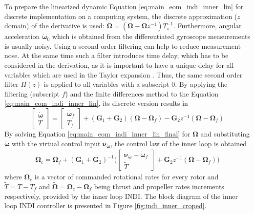 \documentclass[11pt, a4paper, twoside]{report}
\begin{document}
To prepare the linearized dynamic Equation \ref{eq:main_eom_indi_inner_lin} for discrete implementation on a computing system, the discrete approximation ($z$ domain) of the derivative is used: $\bm{\dot{\Omega}} = (\bm{\Omega} - \bm{\Omega}z^{-1})T_s^{-1}$. Furthermore, angular acceleration $\bm{\dot{\omega}}_0$ which is obtained from the differentiated gyroscope measurements is usually noisy. Using a second order filtering can help to reduce measurement nose. At the same time such a filter introduces time delay, which has to be considered in the derivation, as it is important to have a unique delay for all variables which are used in the Taylor expansion \cite{Smeur1}. Thus, the same second order filter $H(z)$ is applied to all variables with a subscript $0$. By applying the filtering (subscript $f$) and the finite differences method to the Equation \ref{eq:main_eom_indi_inner_lin}, its discrete version results in
\begin{equation}
	\begin{bmatrix}
		\bm{\dot{\omega}}\\
		T
	\end{bmatrix} = 
	\begin{bmatrix}
		\bm{\dot{\omega}}_f\\
		T_f
	\end{bmatrix} + (\bm{G}_1+\bm{G}_2)(\bm{\Omega} - \bm{\Omega}_f) - \bm{G}_2z^{-1}(\bm{\Omega} - \bm{\Omega}_f)
	\label{eq:main_eom_indi_inner_lin_final}
\end{equation}
By solving Equation \ref{eq:main_eom_indi_inner_lin_final} for $\bm{\Omega}$ and substituting $\bm{\dot{\omega}}$ with the virtual control input $\bm{\nu}_{\bm{\dot{\omega}}}$, the control law of the inner loop is obtained
\begin{equation}
	\begin{split}
		\bm{\Omega}_c = \bm{\Omega}_f + (\bm{G}_1+\bm{G}_2)^{-1} \Bigg(
		\begin{bmatrix}
			\bm{\nu}_{\bm{\dot{\omega}}} - \bm{\dot{\omega}}_f\\
			\tilde{T}
		\end{bmatrix} + \bm{G}_2z^{-1}(\bm{\Omega} - \bm{\Omega}_f) \Bigg)
		\label{eq:indi_inner_control_law}	
	\end{split}
\end{equation}
where $\bm{\Omega}_c$ is a vector of commanded rotational rates for every rotor and  $\tilde{T} = T - T_f$ and $\tilde{\bm{\Omega}} = \bm{\Omega}_c - \bm{\Omega}_f$ being thrust and propeller rates increments respectively, provided by the inner loop \acrshort{INDI}. The block diagram of the inner loop \acrshort{INDI} controller is presented in Figure \ref{fig:indi_inner_croped}.
\end{document}
